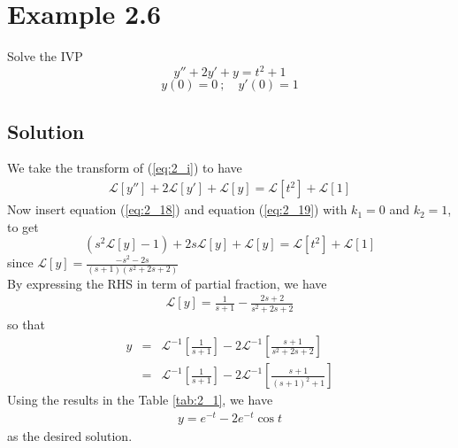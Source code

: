 \documentclass[11pt]{report}
\newcommand{\Laplace}{\mathcal{L}}
\newcommand{\sbracket}[1]{\left[#1\right]}
\newcommand{\Ly}{\Laplace \sbracket{y}}
\newcommand{\LFn}[1]{\Laplace \sbracket{#1}}
\newcommand{\InverseL}[1]{\Laplace^{-1}\left[#1\right]}
\newcommand{\sps}{\\[0.2cm]}
\newcommand{\refn}[1]{(\ref{#1})}
\newcommand{\refx}[1]{\refn{eq:#1}}
\newcommand{\dsp}{\displaystyle}
\newcommand{\sprime}{'}
\newcommand{\dprime}{''}
\begin{document}
	\section*{Example 2.6}
	Solve the IVP
	\begin{equation}
		 y\dprime + 2y\sprime + y = t^2 + 1\tag{i} \label{eq:2_i}
	\end{equation}
	\begin{equation}
		y(0)=0~;\quad y\sprime(0)=1 \tag{ii}\label{eq:2_ii}
	\end{equation}
	
	\subsection*{Solution}
	We take the transform of \refx{2_i} to have 
	\begin{eqnarray*}
		\LFn{y\dprime} + 2 \LFn{y\sprime} + \LFn{y} = \LFn{t^2}+ \LFn{1}
	\end{eqnarray*}
	Now insert equation \refx{2_18} and equation \refx{2_19} with $k_1=0$ and $k_2=1$, to get
	\begin{equation*}
		(s^2\LFn{y}-1)+ 2s\LFn{y} + \LFn{y} = \LFn{t^2} + \LFn{1}
	\end{equation*}
	since $\dsp\LFn{y} = \frac{-s^2-2s}{(s+1)(s^2+2s+2)}$\sps
	By expressing the RHS in term of partial fraction, we have
	\begin{eqnarray*}
		\Ly = \frac{1}{s+1} -\frac{2s+2}{s^2+2s+2}
	\end{eqnarray*}
	so that
	\begin{eqnarray*}
		y&=&\InverseL{\frac{1}{s+1}} - 2\InverseL{\frac{s+1}{s^2+2s+2}}\sps
		&=&\InverseL{\frac{1}{s+1}} - 2\InverseL{\frac{s+1}{(s+1)^2 +1}}
	\end{eqnarray*}
	Using the results in the Table \ref{tab:2_1}, we have
	\begin{eqnarray*}
		y=e^{-t} - 2e^{-t}\cos t
	\end{eqnarray*}
	as the desired solution.
	
\end{document}
